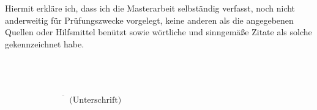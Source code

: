 Hiermit erkläre ich, dass ich die Masterarbeit selbständig verfasst, noch nicht anderweitig
für Prüfungszwecke vorgelegt, keine anderen als die angegebenen Quellen oder Hilfsmittel
benützt sowie wörtliche und sinngemäße Zitate als solche gekennzeichnet habe.
\\ \\ \\ \\
\begin{flushright}
$\overline{~~~~~~~~~~~~~~~~~~~~~~~~~~~~~~~~~~\mbox{(Unterschrift)}}$
\end{flushright}

